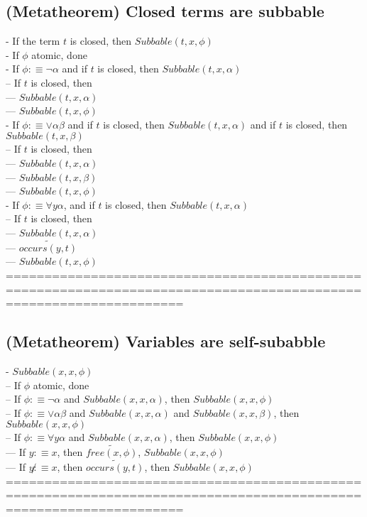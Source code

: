 \documentclass{book}
\newcommand{\is}{:\equiv}
\newcommand{\pnot}[1]{\widetilde{#1}}
\newcommand{\inot}{\not}
\newcommand{\occurs}[2]{occurs(#1, #2)}
\newcommand{\free}[2]{free(#1, #2)}
\begin{document}
\subsection{(Metatheorem) Closed terms are subbable} %
	- If the term $t$ is closed, then $Subbable(t, x, \phi)$ \\
	- If $\phi$ atomic, done \\
	- If $\phi \is \lnot \alpha$ and if $t$ is closed, then $Subbable(t, x, \alpha)$ \\
		-- If $t$ is closed, then \\
			--- $Subbable(t, x, \alpha)$ \\
			--- $Subbable(t, x, \phi)$ \\
	- If $\phi \is \lor \alpha \beta$ and if $t$ is closed, then $Subbable(t, x, \alpha)$ and if $t$ is closed, then $Subbable(t, x, \beta)$ \\
		-- If $t$ is closed, then \\
			--- $Subbable(t, x, \alpha)$ \\
			--- $Subbable(t, x, \beta)$\\
			--- $Subbable(t, x, \phi)$ \\
	- If $\phi \is \forall y \alpha$, and if $t$ is closed, then $Subbable(t, x, \alpha)$ \\
		-- If $t$ is closed, then \\
			--- $Subbable(t, x, \alpha)$ \\
			--- $\pnot{\occurs{y}{t}}$ \\
			--- $Subbable(t, x, \phi)$ \\
	===================================================================================================================
\subsection{(Metatheorem) Variables are self-subabble} %
	- $Subbable(x, x, \phi)$ \\
		-- If $\phi$ atomic, done \\
		-- If $\phi \is \lnot \alpha$ and $Subbable(x, x, \alpha)$, then $Subbable(x, x, \phi)$ \\
		-- If $\phi \is \lor \alpha \beta$ and $Subbable(x, x, \alpha)$ and $Subbable(x, x, \beta)$, then $Subbable(x, x, \phi)$ \\
		-- If $\phi \is \forall y \alpha$ and $Subbable(x, x, \alpha)$, then $Subbable(x, x, \phi)$ \\
			--- If $y \is x$, then $\pnot{\free{x}{\phi}}$, $Subbable(x, x, \phi)$ \\
			--- If $y \inot \is x$, then $\pnot{\occurs{y}{t}}$, then $Subbable(x, x, \phi)$ \\
	===================================================================================================================
\end{document}

